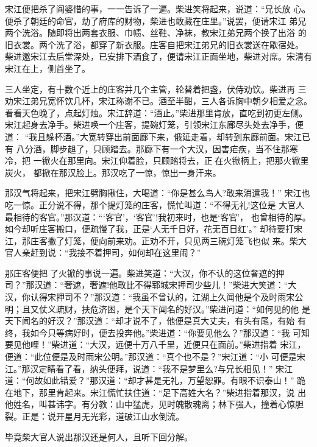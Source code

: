 宋江便把杀了阎婆惜的事，一一告诉了一遍。柴进笑将起来，说道：“兄长放
心。便杀了朝廷的命官，劫了府库的财物，柴进也敢藏在庄里。”说罢，便请宋江
弟兄两个洗浴。随即将出两套衣服、巾帻、丝鞋、净袜，教宋江弟兄两个换了出浴
的旧衣裳。两个洗了浴，都穿了新衣服。庄客自把宋江弟兄的旧衣裳送在歇宿处。
柴进邀宋江去后堂深处，已安排下酒食了，便请宋江正面坐地，柴进对席。宋清有
宋江在上，侧首坐了。

三人坐定，有十数个近上的庄客并几个主管，轮替着把盏，伏侍劝饮。柴进再
三劝宋江弟兄宽怀饮几杯，宋江称谢不已。酒至半酣，三人各诉胸中朝夕相爱之念。
看看天色晚了，点起灯烛。宋江辞道：“酒止。”柴进那里肯放，直吃到初更左侧。
宋江起身去净手。柴进唤一个庄客，提碗灯笼，引领宋江东廊尽头处去净手，便道：
“我且躲杯酒。”大宽转穿出前面廊下来，俄延走着，却转到东廊前面。宋江已有
八分酒，脚步趄了，只顾踏去。那廊下有一个大汉，因害疟疾，当不住那寒冷，把
一锨火在那里向。宋江仰着脸，只顾踏将去，正在火锨柄上，把那火锨里炭火，
都掀在那汉脸上。那汉吃了一惊，惊出一身汗来。

那汉气将起来，把宋江劈胸揪住，大喝道：“你是甚么鸟人?敢来消遣我！”
宋江也吃一惊。正分说不得，那个提灯笼的庄客，慌忙叫道：“不得无礼!这位是
大官人最相待的客官。”那汉道：“‘客官’，‘客官’!我初来时，也是‘客官’，
也曾相待的厚。如今却听庄客搬口，便疏慢了我，正是‘人无千日好，花无百日红’。”
却待要打宋江，那庄客撇了灯笼，便向前来劝。正劝不开，只见两三碗灯笼飞也似
来。柴大官人亲赶到说：“我接不着押司，如何却在这里闹？”

那庄客便把了火锨的事说一遍。柴进笑道：“大汉，你不认的这位奢遮的押
司？”那汉道：“奢遮，奢遮!他敢比不得郓城宋押司少些儿！”柴进大笑道：“大
汉，你认得宋押司不？”那汉道：“我虽不曾认的，江湖上久闻他是个及时雨宋公
明；且又仗义疏财，扶危济困，是个天下闻名的好汉。”柴进问道：“如何见的他
是天下闻名的好汉？”那汉道：“却才说不了，他便是真大丈夫，有头有尾，有始
有终，我如今只等病好时，便去投奔他。”柴进道：“你要见他么？”那汉道：“我
可知要见他哩！”柴进道：“大汉，远便十万八千里，近便只在面前。”柴进指着
宋江，便道：“此位便是及时雨宋公明。”那汉道：“真个也不是？”宋江道：“小
可便是宋江。”那汉定睛看了看，纳头便拜，说道：“我不是梦里么?与兄长相见！”
宋江道：“何故如此错爱？”那汉道：“却才甚是无礼，万望恕罪。有眼不识泰山！”
跪在地下，那里肯起来。宋江慌忙扶住道：“足下高姓大名？”柴进指着那汉，说
出他姓名，叫甚讳字。有分教：山中猛虎，见时魄散魂离；林下强人，撞着心惊胆
裂。正是：说开星月无光彩，道破江山水倒流。

毕竟柴大官人说出那汉还是何人，且听下回分解。